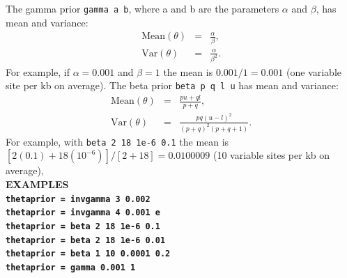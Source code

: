 \documentclass[a4paper]{book}
\numberwithin{equation}{section} \renewcommand{\baselinestretch}{0.55}
\begin{document}
The gamma prior \texttt{gamma a b}, where a and b are the parameters $\alpha$ and $\beta$,
has mean and variance:
\begin{eqnarray}
  \textrm{Mean}(\theta) & = & \frac{\alpha}{\beta}, \nonumber \\
  \textrm{Var}(\theta) & = & \frac{\alpha}{\beta^2}. \nonumber
\end{eqnarray}
For example, if $\alpha=0.001$ and $\beta=1$ the mean is $0.001/1 = 0.001$ (one
variable site per kb on average).
The beta prior \texttt{beta p q l u} has mean and variance:
\begin{eqnarray}
  \textrm{Mean}(\theta) & = & \frac{p u + q l}{p + q}, \nonumber \\
  \textrm{Var}(\theta) & = & \frac{p q (u - l)^2}{(p + q)^2 (p + q + 1)}. \nonumber                              
\end{eqnarray}
For example, with \texttt{beta 2 18 1e-6 0.1} the mean is
$[2(0.1)+18(10^{-6})]/[2+18] = 0.0100009$ (10 variable sites per kb on average),
\vspace{5pt}\\
\textbf{EXAMPLES} \vspace{5pt}\\
\textbf{\texttt{thetaprior = invgamma 3 0.002}} \vspace{5pt}\\
\textbf{\texttt{thetaprior = invgamma 4 0.001 e}}\vspace{5pt}\\
\textbf{\texttt{thetaprior = beta 2 18 1e-6 0.1}}\vspace{5pt}\\
\textbf{\texttt{thetaprior = beta 2 18 1e-6 0.01}}\vspace{5pt}\\
\textbf{\texttt{thetaprior = beta 1 10 0.0001 0.2}}\vspace{5pt}\\
\textbf{\texttt{thetaprior = gamma 0.001 1}}\vspace{10pt}\\
\end{document}
